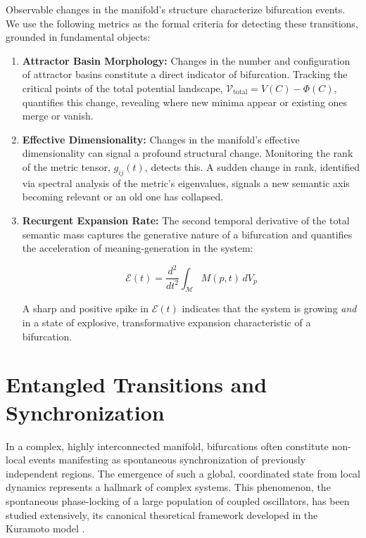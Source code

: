 Observable changes in the manifold's structure characterize bifurcation events. We use the following metrics as the formal criteria for detecting these transitions, grounded in fundamental objects:

\begin{enumerate}

    \item \textbf{Attractor Basin Morphology:} Changes in the number and configuration of attractor basins constitute a direct indicator of bifurcation. Tracking the critical points of the total potential landscape, \(\mathcal{V}_{\text{total}} = V(C) - \Phi(C)\), quantifies this change, revealing where new minima appear or existing ones merge or vanish.
    
    \item \textbf{Effective Dimensionality:} Changes in the manifold's effective dimensionality can signal a profound structural change. Monitoring the rank of the metric tensor, \(g_{ij}(t)\), detects this. A sudden change in rank, identified via spectral analysis of the metric's eigenvalues, signals a new semantic axis becoming relevant or an old one has collapsed.
    
    \item \textbf{Recurgent Expansion Rate:} The second temporal derivative of the total semantic mass captures the generative nature of a bifurcation and quantifies the acceleration of meaning-generation in the system:

    \begin{equation}
    \mathcal{E}(t) = \frac{d^2}{dt^2}\int_{\mathcal{M}} M(p,t) \, dV_p
    \end{equation} 
    
    A sharp and positive spike in \(\mathcal{E}(t)\) indicates that the system is growing \textit{and} in a state of explosive, transformative expansion characteristic of a bifurcation.
    
\end{enumerate}


\section{Entangled Transitions and Synchronization}
\label{11.4:entangled_transitions_and_synchronization}

In a complex, highly interconnected manifold, bifurcations often constitute non-local events manifesting as spontaneous synchronization of previously independent regions. The emergence of such a global, coordinated state from local dynamics represents a hallmark of complex systems. This phenomenon, the spontaneous phase-locking of a large population of coupled oscillators, has been studied extensively, its canonical theoretical framework developed in the Kuramoto model \autocite{Kuramoto1975}.

